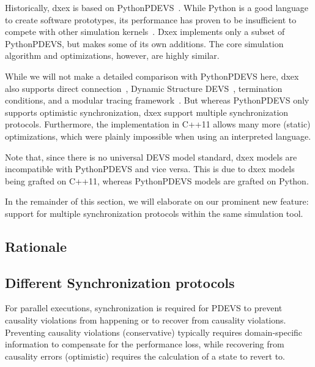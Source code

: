 Historically, dxex is based on PythonPDEVS~\cite{PythonPDEVS}.
While Python is a good language to create software prototypes, its performance has proven to be insufficient to compete with other simulation kernels~\cite{MasterThesis}.
Dxex implements only a subset of PythonPDEVS, but makes some of its own additions.
The core simulation algorithm and optimizations, however, are highly similar.

While we will not make a detailed comparison with PythonPDEVS here, dxex also supports direct connection~\cite{SymbolicFlattening}, \textsf{Dynamic Structure DEVS}~\cite{DSDEVS}, termination conditions, and a modular tracing framework~\cite{PythonPDEVS}.
But whereas PythonPDEVS only supports optimistic synchronization, dxex support multiple synchronization protocols.
Furthermore, the implementation in C++11 allows many more (static) optimizations, which were plainly impossible when using an interpreted language.

Note that, since there is no universal \textsf{DEVS} model standard, dxex models are incompatible with PythonPDEVS and vice versa.
This is due to dxex models being grafted on C++11, whereas PythonPDEVS models are grafted on Python.

In the remainder of this section, we will elaborate on our prominent new feature: support for multiple synchronization protocols within the same simulation tool.

\subsection{Rationale}



\subsection{Different Synchronization protocols}
For parallel executions, synchronization is required for PDEVS to prevent causality violations from happening or to recover from causality violations. Preventing causality violations (conservative) typically requires domain-specific information to compensate for the performance loss, while recovering from causality errors (optimistic) requires the calculation of a state to revert to.


